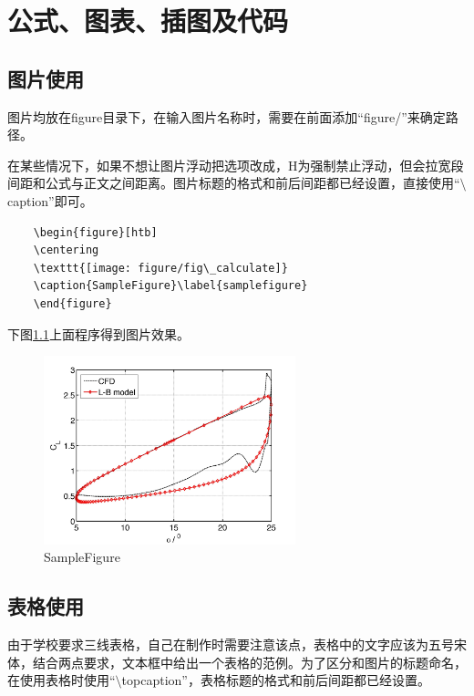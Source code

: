 \chapter{公式、图表、插图及代码}
\songti\xiaosi
\begin{spacing}{1.5}
	\section{图片使用}
	图片均放在figure目录下，在输入图片名称时，需要在前面添加“figure/”来确定路径。
	
	在某些情况下，如果不想让图片浮动把\fbox{[htb]}选项改成\fbox{[H]}，H为强制禁止浮动，但会拉宽段间距和公式与正文之间距离。图片标题的格式和前后间距都已经设置，直接使用“$\setminus$caption”即可。
	
	\begin{lstlisting}
	\begin{figure}[htb]
	\centering
	\texttt{[image: figure/fig\_calculate]}
	\caption{SampleFigure}\label{samplefigure}
	\end{figure}	
	\end{lstlisting}
	
	下图\ref{samplefigure}上面程序得到图片效果。
	
	\begin{figure}[htbp]
		\centering
		\includegraphics[width=0.65\textwidth]{figure/Curve_jpg}
		\caption{SampleFigure}\label{samplefigure}
	\end{figure}
	
	\section{表格使用}
	由于学校要求三线表格，自己在制作时需要注意该点，表格中的文字应该为五号宋体，结合两点要求，文本框中给出一个表格的范例。为了区分和图片的标题命名，在使用表格时使用“$\setminus$topcaption”，表格标题的格式和前后间距都已经设置。
	

\end{spacing}
